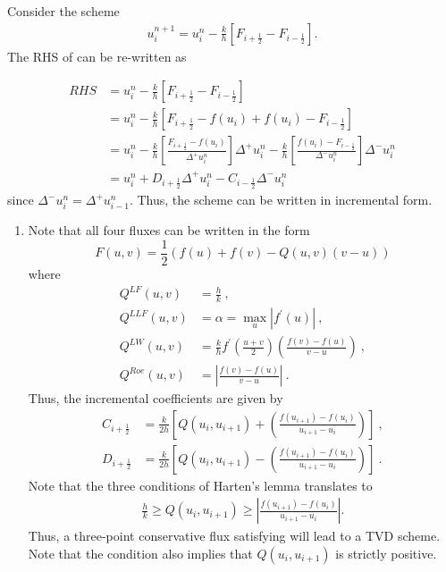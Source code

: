 \documentclass{article}
\newcommand{\iph}{{i + \frac{1}{2}}}
\newcommand{\imh}{{i - \frac{1}{2}}}
\begin{document}





\begin{exerciseList}


\item
Consider the scheme
\begin{gather} \label{3pt_scheme}
u_i^{n+1} = u^n_i - \frac{k}{h} \left[ F_\iph - F_\imh\right].
\end{gather}
The RHS of  can be re-written as

\begin{align*}
RHS &= u^n_i - \frac{k}{h} \left[ F_\iph - F_\imh\right]\\
        &= u^n_i - \frac{k}{h} \left[ F_\iph  - f(u_i) + f(u_i) - F_\imh\right]\\
        &= u^n_i - \frac{k}{h} \left[ \frac{F_\iph  - f(u_i)}{\Delta ^+u_i^n} \right] \Delta ^+u_i^n - \frac{k}{h}\left[\frac{f(u_i) - F_\imh}{\Delta ^-u_i^n}\right]\Delta ^-u_i^n\\
        &= u^n_i +  D_\iph \Delta ^+u_i^n - C_\imh \Delta ^-u_i^n
\end{align*}
since $\Delta ^-u_i^n = \Delta ^+u_{i-1}^n$. Thus, the scheme  can be written in incremental form.

\item 

\begin{enumerate}
\item
Note that all four fluxes can be written in the form
\[
F(u,v) = \frac{1}{2} \left( f(u) + f(v) - Q(u,v) (v-u)\right)
\]
where
\begin{align*}
Q^{LF}(u,v) &= \frac{h}{k}\ ,\\
Q^{LLF}(u,v) &= \alpha = \max_u |f^\prime(u)|\ ,\\
Q^{LW}(u,v) &= \frac{k}{h} f^\prime\left( \frac{u+v}{2}\right)\left(\frac{f(v) - f(u)}{v-u}\right)\ ,\\
Q^{Roe}(u,v) &= \left|\frac{f(v) - f(u)}{v-u}\right|\ .
\end{align*}
Thus, the incremental coefficients are given by
\begin{align*}
C_\iph &= \frac{k}{2h} \left [Q(u_i,u_{i+1})+\left(\frac{f(u_{i+1}) - f(u_i)}{u_{i+1} - u_i}\right) \right]\ ,\\
D_\iph &= \frac{k}{2h} \left [Q(u_i,u_{i+1})-\left(\frac{f(u_{i+1}) - f(u_i)}{u_{i+1} - u_i}\right) \right] \ .
\end{align*}
Note that the three conditions of Harten's lemma translates to 
\begin{align}
\label{1n2n3}
\frac{h}{k} \geq Q(u_i,u_{i+1}) \geq \left|\frac{f(u_{i+1}) - f(u_i)}{u_{i+1} - u_i}\right| .
\end{align}
Thus, a three-point conservative flux satisfying  will lead to a TVD scheme. Note that the condition  also implies that $Q(u_i,u_{i+1})$ is strictly positive.


\end{enumerate}
\end{exerciseList}
\end{document}
